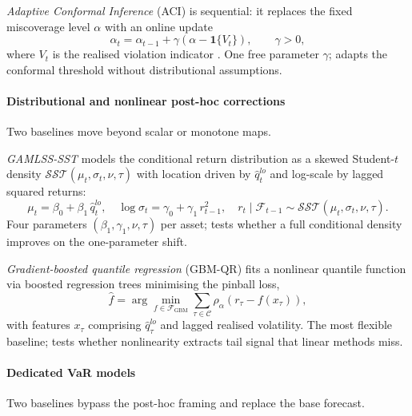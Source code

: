\documentclass[preprint,11pt,authoryear]{elsarticle}
\newcommand{\1}{\boldsymbol{1}}
\begin{document}
\textit{Adaptive Conformal Inference} (ACI) is sequential: it replaces
the fixed miscoverage level $\alpha$ with an online update
\begin{equation}
	\label{eq:aci}
	\alpha_t=\alpha_{t-1}+\gamma\!\left(\alpha-\mathbf 1\{V_t\}\right),
	\qquad \gamma>0,
\end{equation}
where $V_t$ is the realised violation indicator
\citep{gibbs2021adaptive}. One free parameter $\gamma$; adapts the
conformal threshold without distributional assumptions.

\paragraph*{Distributional and nonlinear post-hoc corrections}
Two baselines move beyond scalar or monotone maps.

\textit{GAMLSS-SST} \citep{rigby2005generalized} models the conditional
return distribution as a skewed Student-$t$ density
$\mathcal{SST}(\mu_t,\sigma_t,\nu,\tau)$ with location driven by
$\hat q_t^{lo}$ and log-scale by lagged squared returns:
\begin{equation}
	\label{eq:gamlss}
	\mu_t=\beta_0+\beta_1\,\hat q_t^{lo},
	\quad
	\log\sigma_t = \gamma_0 + \gamma_1\,r_{t-1}^2,
	\quad
	r_t\mid\mathcal F_{t-1}\sim\mathcal{SST}(\mu_t,\sigma_t,\nu,\tau).
\end{equation}
Four parameters $(\beta_1,\gamma_1,\nu,\tau)$ per asset; tests whether
a full conditional density improves on the one-parameter shift.

\textit{Gradient-boosted quantile regression} (GBM-QR) fits a nonlinear
quantile function via boosted regression trees minimising the pinball
loss,
\begin{equation}
	\label{eq:gbm_qr}
	\widehat f
	=\arg\min_{f\in\mathcal F_{\mathrm{GBM}}}
	\sum_{\tau\in\mathcal C}
	\rho_\alpha\!\left(r_\tau-f(x_\tau)\right),
\end{equation}
with features $x_\tau$ comprising $\hat q_\tau^{lo}$ and lagged
realised volatility. The most flexible baseline; tests whether
nonlinearity extracts tail signal that linear methods miss.

\paragraph*{Dedicated VaR models}
Two baselines bypass the post-hoc framing and replace the base
forecast.
\end{document}
